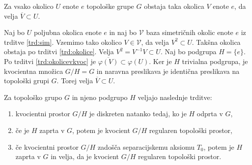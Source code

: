 \documentclass[mat1]{fmfdelo}
\newcommand{\closure}[1]{\overline{#1}}
\begin{document}
\begin{posledica}\label{pos:sim}
Za vsako okolico $U$ enote $e$ topološke grupe $G$ obstaja taka okolica $V$ enote $e$, da velja $\closure{V} \subset U$.
\end{posledica}

\begin{dokaz}
Naj bo $U$ poljubna okolica enote $e$ in naj bo $\mathcal{V}$ baza simetričnih okolic enote $e$ iz trditve \ref{trd:sim}. Vzemimo tako okolico $V \in \mathcal{V}$, da velja $V^2 \subset U$. Takšna okolica obstaja po trditvi \ref{trd:okolice}. Velja $V^2 = V^{-1}V \subset U$. Naj bo podgrupa $H = \lbrace e \rbrace$. Po trditvi \ref{trd:okolicevkvoc} je $\closure{\varphi(V)} \subset \varphi(U)$. Ker je $H$ trivialna podgrupa, je kvocientna množica $G/H = G$ in naravna preslikava je identična preslikava na topološki grupi $G$. Torej velja $\closure{V} \subset U$.
\end{dokaz}

\begin{izrek}\label{izr:kvocreg}
Za topološko grupo $G$ in njeno podgrupo $H$ veljajo naslednje trditve:
\begin{enumerate}
\item kvocientni prostor $G/H$ je diskreten natanko tedaj, ko je $H$ odprta v $G$,\label{podtrd:kvocreg1}
\item če je $H$ zaprta v $G$, potem je kvocient $G/H$ regularen topološki prostor,\label{podtrd:kvocreg2}
\item če kvocientni prostor $G/H$ zadošča separacijskemu aksiomu $T_0$, potem je $H$ zaprta v $G$ in velja, da je kvocient $G/H$ regularen topološki prostor.\label{podtrd:kvocreg3}
\end{enumerate}
\end{izrek}
\end{document}
